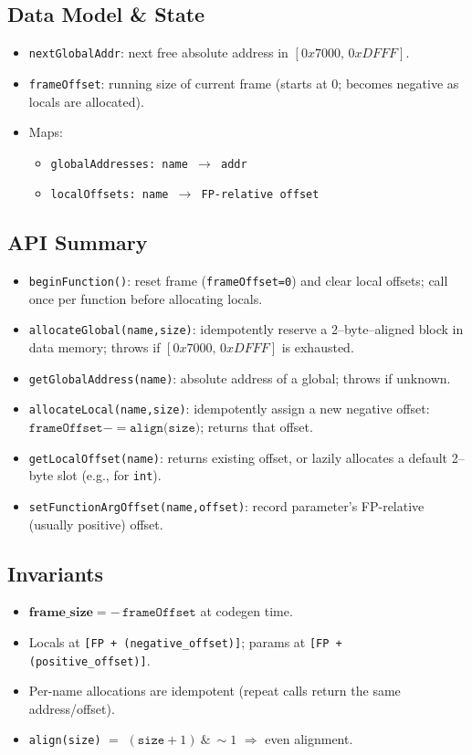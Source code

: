 \documentclass[12pt,a4paper]{report}
\begin{document}
\subsection{Data Model \& State}
\begin{itemize}
    \item \texttt{nextGlobalAddr}: next free absolute address in \([0x7000,\,0xDFFF]\).
    \item \texttt{frameOffset}: running size of current frame (starts at \(0\); becomes negative as locals are allocated).
    \item Maps:
    \begin{itemize}
        \item \texttt{globalAddresses:\ name \(\to\) addr}
        \item \texttt{localOffsets:\ name \(\to\) FP-relative offset}
    \end{itemize}
\end{itemize}

\subsection{API Summary}
\begin{itemize}
    \item \texttt{beginFunction()}: reset frame (\texttt{frameOffset=0}) and clear local offsets; call once per function before allocating locals.
    \item \texttt{allocateGlobal(name,size)}: idempotently reserve a 2–byte–aligned block in data memory; throws if \([0x7000,\,0xDFFF]\) is exhausted.
    \item \texttt{getGlobalAddress(name)}: absolute address of a global; throws if unknown.
    \item \texttt{allocateLocal(name,size)}: idempotently assign a new negative offset: \(\texttt{frameOffset} \mathrel{-=}\texttt{align(size)}\); returns that offset.
    \item \texttt{getLocalOffset(name)}: returns existing offset, or lazily allocates a default 2–byte slot (e.g., for \texttt{int}).
    \item \texttt{setFunctionArgOffset(name,offset)}: record parameter’s FP-relative (usually positive) offset.
\end{itemize}

\subsection{Invariants}
\begin{itemize}
    \item \(\textbf{frame\_size} = -\,\texttt{frameOffset}\) at codegen time.
    \item Locals at \texttt{[FP + (negative\_offset)]}; params at \texttt{[FP + (positive\_offset)]}.
    \item Per-name allocations are idempotent (repeat calls return the same address/offset).
    \item \texttt{align(size)} \(=\) \((\texttt{size}+1)\ \&\ \sim1\) \(\Rightarrow\) even alignment.
\end{itemize}
\end{document}
